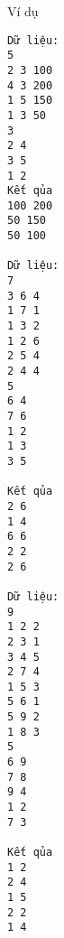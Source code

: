 Ví dụ
\begin{verbatim}
Dữ liệu:
5
2 3 100
4 3 200
1 5 150
1 3 50
3
2 4
3 5
1 2
Kết qủa
100 200
50 150
50 100

Dữ liệu:
7
3 6 4
1 7 1
1 3 2
1 2 6
2 5 4
2 4 4
5
6 4
7 6
1 2
1 3
3 5

Kết qủa
2 6
1 4
6 6
2 2
2 6

Dữ liệu:
9
1 2 2
2 3 1
3 4 5
2 7 4
1 5 3
5 6 1
5 9 2
1 8 3
5
6 9
7 8
9 4
1 2
7 3

Kết qủa
1 2
2 4
1 5
2 2
1 4
\end{verbatim}